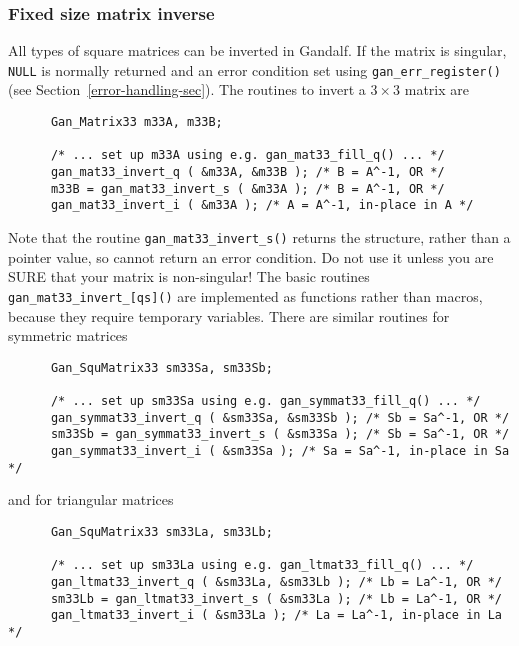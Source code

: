 \subsubsection{Fixed size matrix inverse}
All types of square matrices can be inverted in Gandalf.
If the matrix is singular, {\tt NULL}
is normally returned and an error condition set using
{\tt gan\_err\_register()} (see Section~\ref{error-handling-sec}).
The routines to invert a $3\times 3$ matrix are
\begin{verbatim}
      Gan_Matrix33 m33A, m33B;

      /* ... set up m33A using e.g. gan_mat33_fill_q() ... */
      gan_mat33_invert_q ( &m33A, &m33B ); /* B = A^-1, OR */
      m33B = gan_mat33_invert_s ( &m33A ); /* B = A^-1, OR */
      gan_mat33_invert_i ( &m33A ); /* A = A^-1, in-place in A */
\end{verbatim}
Note that the routine {\tt gan\_mat33\_invert\_s()} returns the structure,
rather than a pointer value, so cannot return an error condition.
Do not use it unless you are SURE that your matrix is non-singular!
The basic routines {\tt gan\_mat33\_invert\_[qs]()} are implemented as
functions rather than macros, because they require temporary variables.
There are similar routines for symmetric matrices
\begin{verbatim}
      Gan_SquMatrix33 sm33Sa, sm33Sb;

      /* ... set up sm33Sa using e.g. gan_symmat33_fill_q() ... */
      gan_symmat33_invert_q ( &sm33Sa, &sm33Sb ); /* Sb = Sa^-1, OR */
      sm33Sb = gan_symmat33_invert_s ( &sm33Sa ); /* Sb = Sa^-1, OR */
      gan_symmat33_invert_i ( &sm33Sa ); /* Sa = Sa^-1, in-place in Sa */
\end{verbatim}
and for triangular matrices
\begin{verbatim}
      Gan_SquMatrix33 sm33La, sm33Lb;

      /* ... set up sm33La using e.g. gan_ltmat33_fill_q() ... */
      gan_ltmat33_invert_q ( &sm33La, &sm33Lb ); /* Lb = La^-1, OR */
      sm33Lb = gan_ltmat33_invert_s ( &sm33La ); /* Lb = La^-1, OR */
      gan_ltmat33_invert_i ( &sm33La ); /* La = La^-1, in-place in La */
\end{verbatim}

